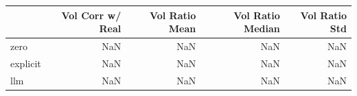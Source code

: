 \begin{tabular}{lrrrr}
\toprule
 & Vol Corr w/ Real & Vol Ratio Mean & Vol Ratio Median & Vol Ratio Std \\
\midrule
zero & NaN & NaN & NaN & NaN \\
explicit & NaN & NaN & NaN & NaN \\
llm & NaN & NaN & NaN & NaN \\
\bottomrule
\end{tabular}

